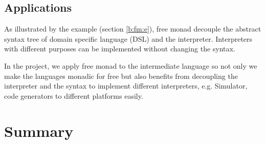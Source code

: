 \subsection{Applications} \label{b:fm:a}
As illustrated by the example (section \ref{b:fm:e}), free monad decouple the abstract syntax tree of domain specific language (DSL) and the interpreter. Interpreters with different purposes can be implemented without changing the syntax.

In the project, we apply free monad to the intermediate language so not only we make the languages monadic for free but also benefits from decoupling the interpreter and the syntax to implement different interpreters, e.g. Simulator, code generators to different platforms easily.
\section{Summary}